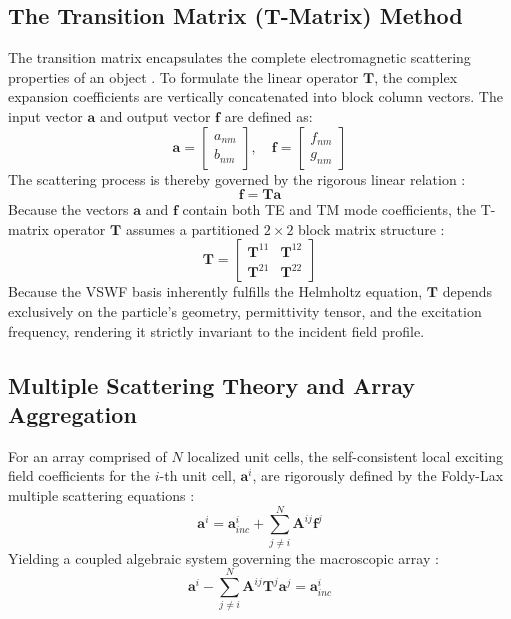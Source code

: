 \documentclass[11pt,a4paper]{article}
\begin{document}
\subsection{The Transition Matrix (T-Matrix) Method} \label{subsec:t_matrix}
The transition matrix encapsulates the complete electromagnetic scattering properties of an object \cite{waterman1965matrix}. To formulate the linear operator $\mathbf{T}$, the complex expansion coefficients are vertically concatenated into block column vectors. The input vector $\mathbf{a}$ and output vector $\mathbf{f}$ are defined as:
\begin{equation}
    \mathbf{a} = \begin{bmatrix} a_{nm} \\ b_{nm} \end{bmatrix}, \quad \mathbf{f} = \begin{bmatrix} f_{nm} \\ g_{nm} \end{bmatrix} \label{eq:coefficient_vectors}
\end{equation}
The scattering process is thereby governed by the rigorous linear relation \cite{waterman1971symmetry}:
\begin{equation}
    \mathbf{f} = \mathbf{T} \mathbf{a} \label{eq:t_matrix_relation}
\end{equation}
Because the vectors $\mathbf{a}$ and $\mathbf{f}$ contain both TE and TM mode coefficients, the T-matrix operator $\mathbf{T}$ assumes a partitioned $2 \times 2$ block matrix structure \cite{mishchenko1996tmatrix}:
\begin{equation}
    \mathbf{T} = \begin{bmatrix} \mathbf{T}^{11} & \mathbf{T}^{12} \\ \mathbf{T}^{21} & \mathbf{T}^{22} \end{bmatrix} \label{eq:t_matrix_blocks}
\end{equation}
Because the VSWF basis inherently fulfills the Helmholtz equation, $\mathbf{T}$ depends exclusively on the particle's geometry, permittivity tensor, and the excitation frequency, rendering it strictly invariant to the incident field profile.

\subsection{Multiple Scattering Theory and Array Aggregation} \label{subsec:multiple_scattering}
For an array comprised of $N$ localized unit cells, the self-consistent local exciting field coefficients for the $i$-th unit cell, $\mathbf{a}^i$, are rigorously defined by the Foldy-Lax multiple scattering equations \cite{foldy1945multiple}:
\begin{equation}
    \mathbf{a}^i = \mathbf{a}_{inc}^i + \sum_{j \neq i}^N \mathbf{A}^{ij} \mathbf{f}^j
    \label{eq:foldy_lax}
\end{equation}
Yielding a coupled algebraic system governing the macroscopic array \cite{tsang2001scattering}:
\begin{equation}
    \mathbf{a}^i - \sum_{j \neq i}^N \mathbf{A}^{ij} \mathbf{T}^j \mathbf{a}^j = \mathbf{a}_{inc}^i
    \label{eq:coupled_system}
\end{equation}
\end{document}

